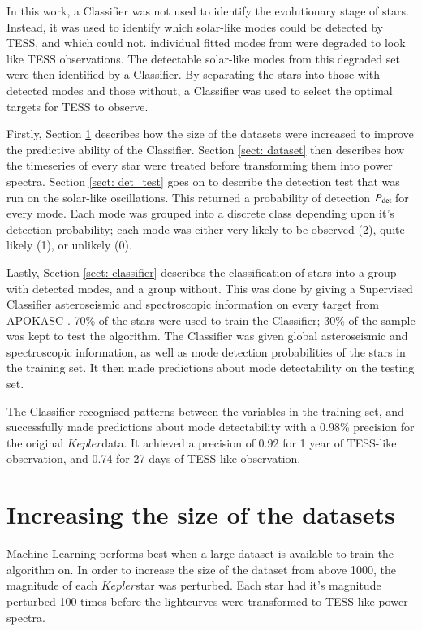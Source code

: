 \documentclass[a4paper,fleqn,usenatbib,useAMS]{mnras}
\newcommand{\kep}{\ensuremath{Kepler}\:}
\newcommand{\pdet}{\ensuremath{P_{\rm det}\:}}
\begin{document}
In this work, a Classifier was not used to identify the evolutionary stage of stars. Instead, it was used to identify which solar-like modes could be detected by TESS, and which could not. individual fitted modes from \citet{davies_asteroseismology_2016} were degraded to look like TESS observations. The detectable solar-like modes from this degraded set were then identified by a Classifier. By separating the stars into those with detected modes and those without, a Classifier was used to select the optimal targets for TESS to observe.

Firstly, Section \ref{sect: size} describes how the size of the datasets were increased to improve the predictive ability of the Classifier. Section \ref{sect: dataset} then describes how the timeseries of every star were treated before transforming them into power spectra. Section \ref{sect: det_test} goes on to describe the detection test that was run on the solar-like oscillations. This returned a probability of detection \pdet for every mode. Each mode was grouped into a discrete class depending upon it's detection probability; each mode was either very likely to be observed (2), quite likely (1), or unlikely (0).

Lastly, Section \ref{sect: classifier} describes the classification of stars into a group with detected modes, and a group without. This was done by giving a Supervised Classifier asteroseismic and spectroscopic information on every target from APOKASC \citep{pinsonneault_apokasc_2014}. 70\% of the stars were used to train the Classifier; 30\% of the sample was kept to test the algorithm. The Classifier was given global asteroseismic and spectroscopic information, as well as mode detection probabilities of the stars in the training set. It then made predictions about mode detectability on the testing set.

The Classifier recognised patterns between the variables in the training set, and successfully made predictions about mode detectability with a 0.98\% precision for the original \kep data. It achieved a precision of 0.92 for 1 year of TESS-like observation, and 0.74 for 27 days of TESS-like observation.



\section{Increasing the size of the datasets}
\label{sect: size}

Machine Learning performs best when a large dataset is available to train the algorithm on. In order to increase the size of the dataset from \citet{davies_asteroseismology_2016} above 1000, the magnitude of each \kep star was perturbed. Each star had it's magnitude perturbed 100 times before the lightcurves were transformed to TESS-like power spectra. 
\end{document}
